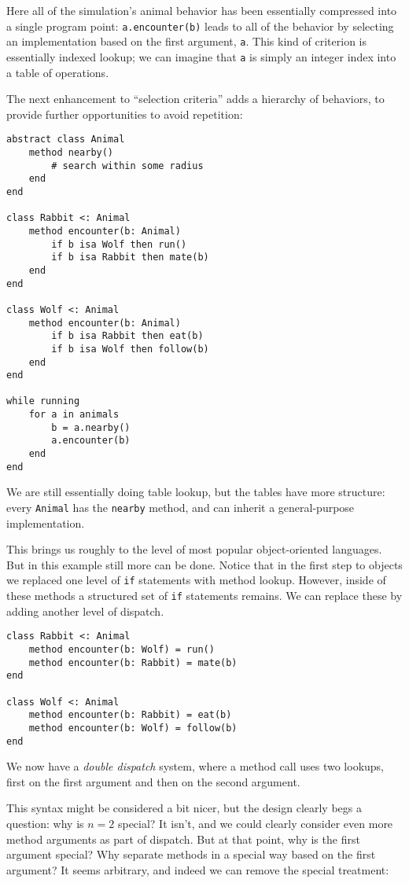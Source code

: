Here all of the simulation's animal behavior has been essentially
compressed into a single program point: \texttt{a.encounter(b)}
leads to all of the behavior by selecting an implementation based
on the first argument, \texttt{a}. This kind of criterion is
essentially indexed lookup; we can imagine that \texttt{a} is
simply an integer index into a table of operations.

The next enhancement to ``selection criteria'' adds a hierarchy
of behaviors, to provide further opportunities to avoid
repetition:

\begin{verbatim}
abstract class Animal
    method nearby()
        # search within some radius
    end
end

class Rabbit <: Animal
    method encounter(b: Animal)
        if b isa Wolf then run()
        if b isa Rabbit then mate(b)
    end
end

class Wolf <: Animal
    method encounter(b: Animal)
        if b isa Rabbit then eat(b)
        if b isa Wolf then follow(b)
    end
end

while running
    for a in animals
        b = a.nearby()
        a.encounter(b)
    end
end
\end{verbatim}

We are still essentially doing table lookup, but the tables have
more structure: every \texttt{Animal} has the \texttt{nearby}
method, and can inherit a general-purpose implementation.

This brings us roughly to the level of most popular object-oriented
languages. But in this example still more can be done. Notice that
in the first step to objects we replaced one level of \texttt{if}
statements with method lookup. However, inside of these methods
a structured set of \texttt{if} statements remains. We can
replace these by adding another level of dispatch.

\begin{verbatim}
class Rabbit <: Animal
    method encounter(b: Wolf) = run()
    method encounter(b: Rabbit) = mate(b)
end

class Wolf <: Animal
    method encounter(b: Rabbit) = eat(b)
    method encounter(b: Wolf) = follow(b)
end
\end{verbatim}

We now have a \emph{double dispatch} system, where a method call
uses two lookups, first on the first argument and then on the
second argument.

This syntax might be considered a bit nicer, but the design
clearly begs a question: why is $n=2$ special? It isn't, and we
could clearly consider even more method arguments as part of
dispatch. But at that point, why is the first argument special?
Why separate methods in a special way based on the first argument?
It seems arbitrary, and indeed we can remove the special treatment:

